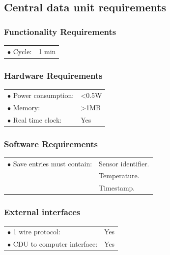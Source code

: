 \subsection{Central data unit requirements}

\subsubsection{Functionality Requirements}
\begin{table}[H]
\begin{tabular}{p{8cm} p{2cm}}
$\bullet$ Cycle\footnotemark: & 1 min\\
\end{tabular}
\end{table}
\subsubsection{Hardware Requirements}
\begin{table}[H]
\begin{tabular}{p{8cm} p{2cm}}
$\bullet$ Power consumption: & <0.5W \footnotemark \\
$\bullet$ Memory: & >1MB\footnotemark\\
$\bullet$ Real time clock: & Yes\\
\end{tabular}
\end{table}

\subsubsection{Software Requirements}
\begin{table}[H]
\begin{tabular}{p{8cm} p{2cm}}
$\bullet$ Save entries must contain: &Sensor identifier. \\
~ 									&Temperature. \\
~									&Timestamp. \\


\end{tabular}
\end{table}


\subsubsection{External interfaces}
\begin{table}[H]
\begin{tabular}{p{8cm} p{2cm}}
$\bullet$ 1 wire protocol: & Yes\\
$\bullet$ CDU to computer interface: & Yes\\
\end{tabular}
\end{table}

